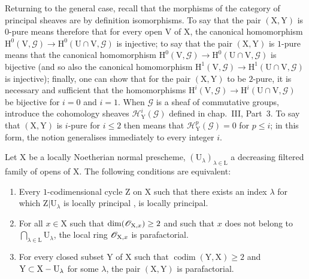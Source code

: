 \begin{remark}[21.13.13]
Returning to the general case, recall that the morphisms of the category of principal sheaves are by definition isomorphisms.
To say that the pair $(\mathrm{X},\mathrm{Y})$ is $0$-pure means therefore that for every open $\mathrm{V}$ of $\mathrm{X}$, the canonical homomorphism $\mathrm{H}^0(\mathrm{V},\mathscr{G})\to\mathrm{H}^0(\mathrm{U}\cap\mathrm{V},\mathscr{G})$ is injective; to say that the pair $(\mathrm{X},\mathrm{Y})$ is $1$-pure means that the canonical homomorphism $\mathrm{H}^0(\mathrm{V},\mathscr{G})\to\mathrm{H}^0(\mathrm{U}\cap\mathrm{V},\mathscr{G})$ is bijective (and so also the canonical homomorphism $\mathrm{H}^1(\mathrm{V},\mathscr{G})\to\mathrm{H}^1(\mathrm{U}\cap\mathrm{V},\mathscr{G})$ is injective); finally, one can show that for the pair $(\mathrm{X},\mathrm{Y})$ to be $2$-pure, it is necessary and sufficient that the homomorphisms $\mathrm{H}^i(\mathrm{V},\mathscr{G})\to\mathrm{H}^i(\mathrm{U}\cap\mathrm{V},\mathscr{G})$ be bijective for $i=0$ and $i=1$.
When $\mathscr{G}$ is a sheaf of commutative groups, introduce the cohomology sheaves $\mathscr{H}^i_{\mathrm{Y}}(\mathscr{G})$ defined in chap.~III, Part~3. To say that $(\mathrm{X},\mathrm{Y})$ is $i$-pure for $i\leq2$ then means that $\mathscr{H}^p_{\mathrm{Y}}(\mathscr{G})=0$ for $p\leq i$; in this form, the notion generalises immediately to every integer $i$.
\end{remark}

\begin{proposition}[21.13.14]
\label{IV.21.13.14}
Let $\mathrm{X}$ be a locally Noetherian normal prescheme, $(\mathrm{U}_\lambda)_{\lambda\in\mathrm{L}}$ a decreasing filtered family of opens of $\mathrm{X}$.
The following conditions are equivalent:
\begin{enumerate}[label=\emph{\alph*)}]
  \item Every $1$-codimensional cycle $\mathrm{Z}$ on $\mathrm{X}$ such that there exists an index $\lambda$ for which $\mathrm{Z}|\mathrm{U}_\lambda$ is locally principal , is locally principal.
  \item For all $x\in\mathrm{X}$ such that $\dim(\mathscr{O}_{\mathrm{X},x})\geq 2$ and such that $x$ does not belong to $\bigcap_{\lambda\in\mathrm{L}}\mathrm{U}_\lambda$, the local ring $\mathscr{O}_{\mathrm{X},x}$ is parafactorial.
  \item[\textup{b$'$)}] For every closed subset $\mathrm{Y}$ of $\mathrm{X}$ such that $\operatorname{codim}(\mathrm{Y},\mathrm{X})\geq 2$ and $\mathrm{Y}\subset\mathrm{X}-\mathrm{U}_\lambda$ for some $\lambda$, the pair $(\mathrm{X},\mathrm{Y})$ is parafactorial.
\end{enumerate}
\end{proposition}

